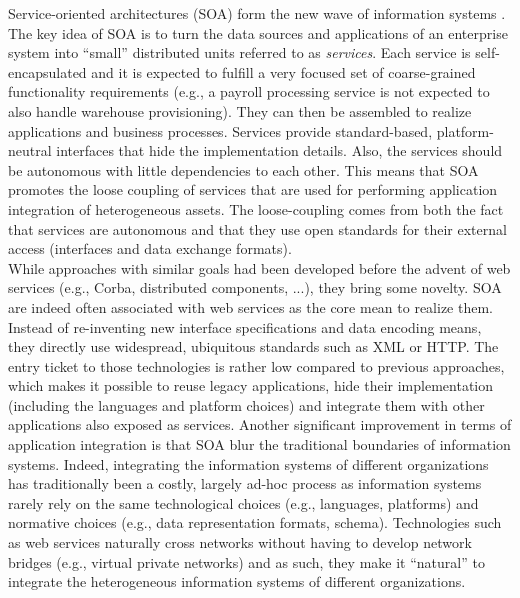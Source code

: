 Service-oriented architectures (SOA) form the new wave of information systems \cite{PTDL07,PH07}. The key idea of SOA is to turn the data sources and applications of an enterprise system into ``small''  distributed units referred to as \emph{services}. Each service is self-encapsulated and it is expected to fulfill a very focused set of coarse-grained functionality requirements (e.g., a payroll processing service is not expected to also handle warehouse provisioning). They can then be assembled to realize applications and business processes. Services provide standard-based, platform-neutral interfaces that hide the implementation details. Also, the services should be autonomous with little dependencies to each other. This means that SOA promotes the loose coupling of services that are used for performing application integration of heterogeneous assets. The loose-coupling comes from both the fact that services are autonomous and that they use open standards for their external access (interfaces and data exchange formats).\\

While approaches with similar goals had been developed before the advent of web services (e.g., Corba, distributed components, ...), they bring some novelty. SOA are indeed often associated with web services as the core mean to realize them. Instead of re-inventing new interface specifications and data encoding means, they directly use widespread, ubiquitous standards such as XML or HTTP. The entry ticket to those technologies is rather low compared to previous approaches, which makes it possible to reuse legacy applications, hide their implementation (including the languages and platform choices) and integrate them with other applications also exposed as services. Another significant improvement in terms of application integration is that SOA blur the traditional boundaries of information systems. Indeed, integrating the information systems of different organizations has traditionally been a costly, largely ad-hoc process as information systems rarely rely on the same technological choices (e.g., languages, platforms) and normative choices (e.g., data representation formats, schema). Technologies such as web services naturally cross networks without having to develop network bridges (e.g., virtual private networks) and as such, they make it ``natural'' to integrate the heterogeneous information systems of different organizations.\\


